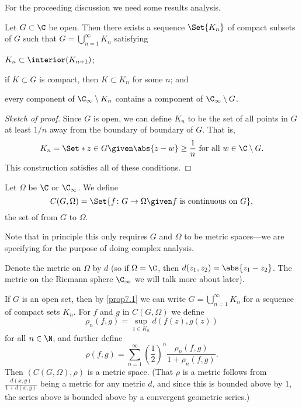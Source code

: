 


For the proceeding discussion we need some results analysis.

\begin{proposition}\label{prop7.1}
	Let $G \subset \C$ be open.
	Then there exists a sequence $\Set{K_n}$ of compact subsets of $G$ such that $G = \bigcup\limits_{n = 1}^\infty K_n$ satisfying
	\begin{items}
		\item $K_n \subset \interior(K_{n + 1})$;
		\item if $K \subset G$ is compact, then $K \subset K_n$ for some $n$; and
		\item every component of $\C_\infty \setminus K_n$ contains a component of $\C_\infty \setminus G$.
	\end{items}
\end{proposition}

\begin{proof}[Sketch of proof]
	Since $G$ is open, we can define $K_n$ to be the set of all points in $G$ at least $1/n$ away from the boundary of boundary of $G$.
	That is,
	\[
		K_n = \Set*{z \in G \given \abs{z - w} \geq \frac{1}{n} \text{ for all } w \in \C \setminus G}.
	\]
	This construction satisfies all of these conditions.
\end{proof}

\begin{definition}
	Let $\Omega$ be $\C$ or $\C_\infty$.
	We define
	\[
		C(G, \Omega) = \Set{f \colon G \to \Omega \given f \text{ is continuous on } G},
	\]
	the set of  from $G$ to $\Omega$.
\end{definition}

\begin{remark}
	Note that in principle this only requires $G$ and $\Omega$ to be metric spaces---we are specifying for the purpose of doing complex analysis.
\end{remark}

Denote the metric on $\Omega$ by $d$ (so if $\Omega = \C$, then $d(z_1, z_2) = \abs{z_1 - z_2}$.
The metric on the Riemann sphere $\C_\infty$ we will talk more about later).

If $G$ is an open set, then by \autoref{prop7.1} we can write $G = \bigcup\limits_{n = 1}^\infty K_n$ for a sequence of compact sets $K_n$.
For $f$ and $g$ in $C(G, \Omega)$ we define
\[
	\rho_n(f, g) = \sup_{z \in K_n} d(f(z), g(z))
\]
for all $n \in \N$, and further define
\[
	\rho(f, g) = \sum_{n = 1}^\infty \left ( \frac{1}{2} \right )^n \frac{\rho_n(f, g)}{1 + \rho_n(f, g)}.
\]
Then $(C(G, \Omega), \rho)$ is a metric space.
(That $\rho$ is a metric follows from $\frac{d(x, y)}{1 + d(x, y)}$ being a metric for any metric $d$, and since this is bounded above by $1$, the series above is bounded above by a convergent geometric series.)

